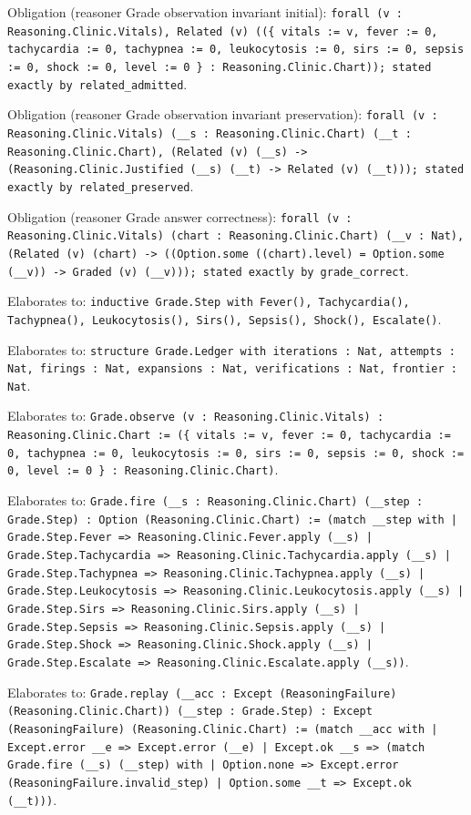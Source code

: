 \documentclass[11pt]{article}
\begin{document}
\noindent Obligation (reasoner Grade observation invariant initial): \texttt{forall (v : Reasoning.Clinic.Vitals), Related (v) ((\{ vitals := v, fever := 0, tachycardia := 0, tachypnea := 0, leukocytosis := 0, sirs := 0, sepsis := 0, shock := 0, level := 0 \} : Reasoning.Clinic.Chart)); stated exactly by related\_admitted}.\par
\noindent Obligation (reasoner Grade observation invariant preservation): \texttt{forall (v : Reasoning.Clinic.Vitals) (\_\_s : Reasoning.Clinic.Chart) (\_\_t : Reasoning.Clinic.Chart), (Related (v) (\_\_s) -> (Reasoning.Clinic.Justified (\_\_s) (\_\_t) -> Related (v) (\_\_t))); stated exactly by related\_preserved}.\par
\noindent Obligation (reasoner Grade answer correctness): \texttt{forall (v : Reasoning.Clinic.Vitals) (chart : Reasoning.Clinic.Chart) (\_\_v : Nat), (Related (v) (chart) -> ((Option.some ((chart).level) = Option.some (\_\_v)) -> Graded (v) (\_\_v))); stated exactly by grade\_correct}.\par
\noindent Elaborates to: \texttt{inductive Grade.Step with Fever(), Tachycardia(), Tachypnea(), Leukocytosis(), Sirs(), Sepsis(), Shock(), Escalate()}.\par
\noindent Elaborates to: \texttt{structure Grade.Ledger with iterations : Nat, attempts : Nat, firings : Nat, expansions : Nat, verifications : Nat, frontier : Nat}.\par
\noindent Elaborates to: \texttt{Grade.observe (v : Reasoning.Clinic.Vitals) : Reasoning.Clinic.Chart := (\{ vitals := v, fever := 0, tachycardia := 0, tachypnea := 0, leukocytosis := 0, sirs := 0, sepsis := 0, shock := 0, level := 0 \} : Reasoning.Clinic.Chart)}.\par
\noindent Elaborates to: \texttt{Grade.fire (\_\_s : Reasoning.Clinic.Chart) (\_\_step : Grade.Step) : Option (Reasoning.Clinic.Chart) := (match \_\_step with | Grade.Step.Fever => Reasoning.Clinic.Fever.apply (\_\_s) | Grade.Step.Tachycardia => Reasoning.Clinic.Tachycardia.apply (\_\_s) | Grade.Step.Tachypnea => Reasoning.Clinic.Tachypnea.apply (\_\_s) | Grade.Step.Leukocytosis => Reasoning.Clinic.Leukocytosis.apply (\_\_s) | Grade.Step.Sirs => Reasoning.Clinic.Sirs.apply (\_\_s) | Grade.Step.Sepsis => Reasoning.Clinic.Sepsis.apply (\_\_s) | Grade.Step.Shock => Reasoning.Clinic.Shock.apply (\_\_s) | Grade.Step.Escalate => Reasoning.Clinic.Escalate.apply (\_\_s))}.\par
\noindent Elaborates to: \texttt{Grade.replay (\_\_acc : Except (ReasoningFailure) (Reasoning.Clinic.Chart)) (\_\_step : Grade.Step) : Except (ReasoningFailure) (Reasoning.Clinic.Chart) := (match \_\_acc with | Except.error \_\_e => Except.error (\_\_e) | Except.ok \_\_s => (match Grade.fire (\_\_s) (\_\_step) with | Option.none => Except.error (ReasoningFailure.invalid\_step) | Option.some \_\_t => Except.ok (\_\_t)))}.\par
\end{document}
